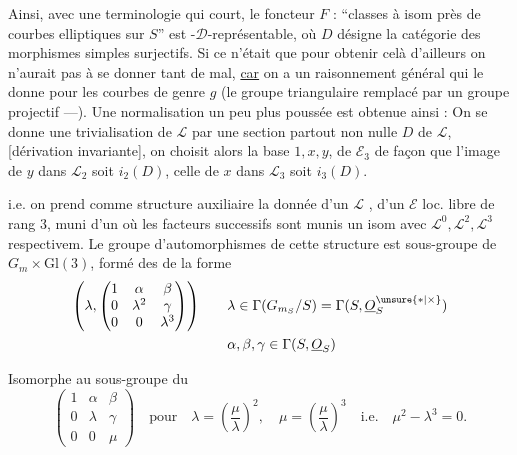 Ainsi, avec une terminologie qui court, le foncteur $F$ : ``classes à isom près de courbes elliptiques sur $S$'' est -$\mathcal D$-représentable, où $D$ désigne la catégorie des morphismes simples surjectifs. Si ce n'était que pour obtenir celà d'ailleurs on n'aurait pas à se donner tant de mal, \uline{car}  on a un raisonnement général qui le donne pour les courbes de genre $g$  (le groupe triangulaire remplacé par un groupe projectif ---).
Une normalisation  un peu plus poussée est obtenue ainsi : On se donne une trivialisation de $\mathcal L$ par une section partout non nulle $D$ de $\mathcal L$, [dérivation invariante], on choisit alors la base $1,x,y$, de $\mathcal E_3$ de façon que l'image de $y$ dans $\mathcal L_2$ soit $i_2(D)$, celle de $x$ dans $\mathcal L_3$ soit $i_3(D)$. 

\deleted{$[$} i.e. on prend comme structure auxiliaire la donnée d'un $\mathcal L$ , d'un $\mathcal E$ loc. libre de rang 3, muni d'un  où les facteurs successifs sont munis un isom avec $\mathcal L^0,\mathcal L^2,\mathcal L^3$ respectivem. Le groupe d'automorphismes de cette structure est   sous-groupe de $G_m\times\mathrm{Gl}(3)$, formé des   de la forme
\[
\begin{aligned}
\left(\lambda,\begin{pmatrix}1&\alpha&\beta\\0&\lambda^2&\gamma\\0&0&\lambda^3\end{pmatrix}\right)
&\qquad \lambda\in\Gamma(G_{m_S}/S)=\Gamma(S,\underline O_S^{\unsure{*|\times}})\\
&\qquad \alpha,\beta,\gamma\in\Gamma(S,\underline O_S)
\end{aligned}
\]

 Isomorphe  au sous-groupe du  
\[
\begin{pmatrix}1&\alpha&\beta\\0&\lambda&\gamma\\0&0&\mu\end{pmatrix}
\quad\text{pour}\quad \lambda=\left(\frac{\mu}{\lambda}\right)^2,\quad \mu=\left(\frac{\mu}{\lambda}\right)^3
\quad\text{i.e.}\quad \boxed{\mu^2-\lambda^3=0}.
\]

